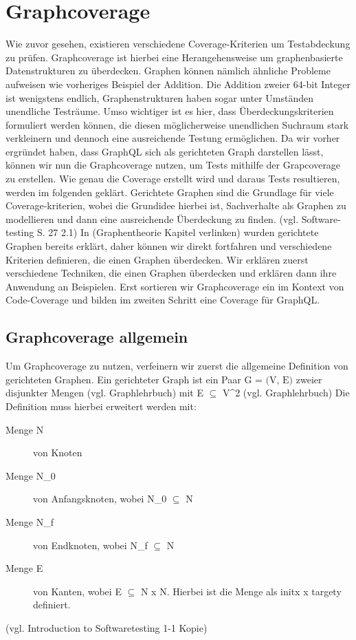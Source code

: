 \chapter{Graphcoverage}

Wie zuvor gesehen, existieren verschiedene Coverage-Kriterien um Testabdeckung zu prüfen.
Graphcoverage ist hierbei eine Herangehensweise um graphenbasierte Datenstrukturen zu überdecken.
Graphen können nämlich ähnliche Probleme aufweisen wie vorheriges Beispiel der Addition.
Die Addition zweier 64-bit Integer ist wenigstens endlich, Graphenstrukturen haben sogar unter Umständen unendliche Testräume.
Umso wichtiger ist es hier, dass Überdeckungskriterien formuliert werden können, die diesen möglicherweise unendlichen Suchraum
stark verkleinern und dennoch eine ausreichende Testung ermöglichen.
Da wir vorher ergründet haben, dass GraphQL sich als gerichteten Graph darstellen lässt, können wir nun die Graphcoverage nutzen, um Tests mithilfe der Grapcoverage zu erstellen.
Wie genau die Coverage erstellt wird und daraus Tests resultieren, werden im folgenden geklärt.
Gerichtete Graphen sind die Grundlage für viele Coverage-kriterien, wobei die Grundidee hierbei ist,
Sachverhalte als Graphen zu modellieren und dann eine ausreichende Überdeckung zu finden. (vgl. Software-testing S. 27 2.1)
In (Graphentheorie Kapitel verlinken) wurden gerichtete Graphen bereits erklärt, daher können wir direkt fortfahren und verschiedene
Kriterien definieren, die einen Graphen überdecken.
Wir erklären zuerst verschiedene Techniken, die einen Graphen überdecken und erklären dann ihre Anwendung
an Beispielen.
Erst sortieren wir Graphcoverage ein im Kontext von Code-Coverage und bilden im zweiten Schritt eine Coverage für GraphQL\@.

\section{Graphcoverage allgemein}

Um Graphcoverage zu nutzen, verfeinern wir zuerst die allgemeine Definition von gerichteten Graphen.
Ein gerichteter Graph ist ein Paar $\textrm{G = (V, E)}$ zweier disjunkter Mengen (vgl. Graphlehrbuch) mit E $\subseteq$ V^2 (vgl. Graphlehrbuch)
Die Definition muss hierbei erweitert werden mit:

\begin{description}
    \item[Menge N] von Knoten
    \item[Menge N_{0}] von Anfangsknoten, wobei N_{0} $\subseteq$ N
    \item[Menge N_{f}] von Endknoten, wobei N_{f} $\subseteq$ N
    \item[Menge E] von Kanten, wobei E $\subseteq$ N x N. Hierbei ist die Menge als init{x} x target{y} definiert.
\end{description} (vgl. Introduction to Softwaretesting 1-1 Kopie)

